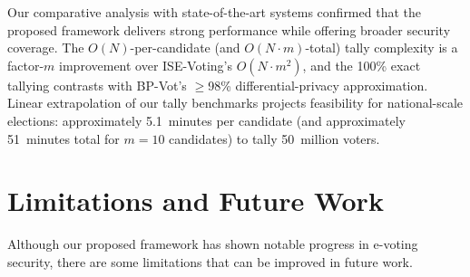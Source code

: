 Our comparative analysis with state-of-the-art systems confirmed that the proposed framework delivers strong performance while offering broader security coverage. The $O(N)$-per-candidate (and $O(N \cdot m)$-total) tally complexity is a factor-$m$ improvement over ISE-Voting's $O(N \cdot m^{2})$, and the 100\% exact tallying contrasts with BP-Vot's $\geq$98\% differential-privacy approximation. Linear extrapolation of our tally benchmarks projects feasibility for national-scale elections: approximately 5.1~minutes per candidate (and approximately 51~minutes total for $m=10$ candidates) to tally 50~million voters.

\section{Limitations and Future Work}
\label{sec:limitations}

Although our proposed framework has shown notable progress in e-voting security, there are some limitations that can be improved in future work.

